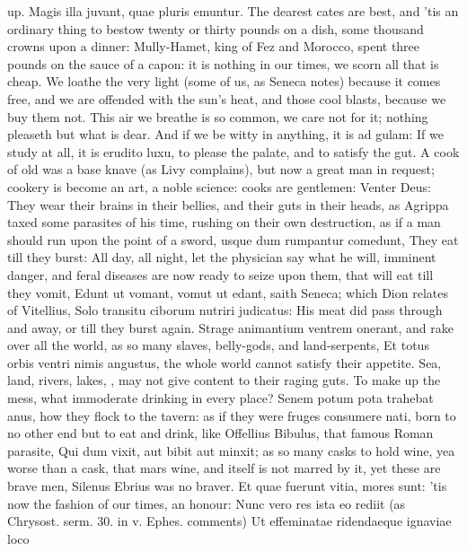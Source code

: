 {up. Magis illa juvant, quae pluris emuntur. The dearest cates are
best, and 'tis an ordinary thing to bestow twenty or thirty pounds on a
dish, some thousand crowns upon a dinner: Mully-Hamet, king of
Fez and Morocco, spent three pounds on the sauce of a capon: it is
nothing in our times, we scorn all that is cheap. We loathe the very
light (some of us, as Seneca notes) because it comes free, and we
are offended with the sun's heat, and those cool blasts, because we buy
them not. This air we breathe is so common, we care not for it; nothing
pleaseth but what is dear. And if we be witty in anything, it is
ad gulam: If we study at all, it is erudito luxu, to please the palate,
and to satisfy the gut. A cook of old was a base knave (as Livy
complains), but now a great man in request; cookery is become an art, a
noble science: cooks are gentlemen: Venter Deus: They wear their brains
in their bellies, and their guts in their heads, as Agrippa taxed
some parasites of his time, rushing on their own destruction, as if a
man should run upon the point of a sword, usque dum rumpantur comedunt,
They eat till they burst: All day, all night, let the physician
say what he will, imminent danger, and feral diseases are now ready to
seize upon them, that will eat till they vomit, Edunt ut vomant, vomut
ut edant, saith Seneca; which Dion relates of Vitellius, Solo transitu
ciborum nutriri judicatus: His meat did pass through and away, or till
they burst again. Strage animantium ventrem onerant, and rake
over all the world, as so many slaves, belly-gods, and
land-serpents, Et totus orbis ventri nimis angustus, the whole world
cannot satisfy their appetite. Sea, land, rivers, lakes, \etc{}, may
not give content to their raging guts. To make up the mess, what
immoderate drinking in every place? Senem potum pota trahebat anus, how
they flock to the tavern: as if they were fruges consumere nati, born
to no other end but to eat and drink, like Offellius Bibulus, that
famous Roman parasite, Qui dum vixit, aut bibit aut minxit; as so many
casks to hold wine, yea worse than a cask, that mars wine, and itself
is not marred by it, yet these are brave men, Silenus Ebrius was no
braver. Et quae fuerunt vitia, mores sunt: 'tis now the fashion of our
times, an honour: Nunc vero res ista eo rediit (as Chrysost. serm. 30.
in v. Ephes. comments) Ut effeminatae ridendaeque ignaviae loco
}
